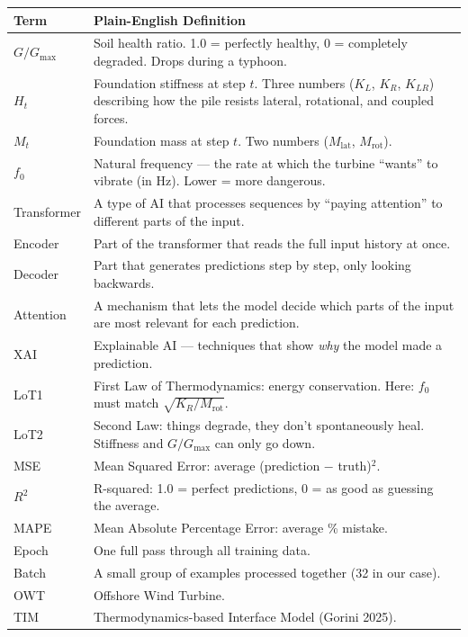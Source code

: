 \documentclass[11pt,a4paper]{article}
\begin{document}
\begin{center}
\begin{tabular}{lp{9.5cm}}
\toprule
\textbf{Term} & \textbf{Plain-English Definition} \\
\midrule
$G/G_{\max}$ & Soil health ratio.  1.0 = perfectly healthy,
  0 = completely degraded.  Drops during a typhoon. \\
$H_t$   & Foundation stiffness at step $t$.  Three numbers
  ($K_L$, $K_R$, $K_{LR}$) describing how the pile resists
  lateral, rotational, and coupled forces. \\
$M_t$   & Foundation mass at step $t$.  Two numbers
  ($M_{\text{lat}}$, $M_{\text{rot}}$). \\
$f_0$   & Natural frequency --- the rate at which the turbine
  ``wants'' to vibrate (in Hz).  Lower = more dangerous. \\
Transformer & A type of AI that processes sequences by
  ``paying attention'' to different parts of the input. \\
Encoder  & Part of the transformer that reads the full input
  history at once. \\
Decoder  & Part that generates predictions step by step,
  only looking backwards. \\
Attention & A mechanism that lets the model decide which parts
  of the input are most relevant for each prediction. \\
XAI      & Explainable AI --- techniques that show \emph{why}
  the model made a prediction. \\
LoT1     & First Law of Thermodynamics: energy conservation.
  Here: $f_0$ must match $\sqrt{K_R/M_{\text{rot}}}$. \\
LoT2     & Second Law: things degrade, they don't spontaneously
  heal.  Stiffness and $G/G_{\max}$ can only go down. \\
MSE      & Mean Squared Error: average (prediction $-$ truth)$^2$. \\
$R^2$    & R-squared: 1.0 = perfect predictions,
  0 = as good as guessing the average. \\
MAPE     & Mean Absolute Percentage Error: average \% mistake. \\
Epoch    & One full pass through all training data. \\
Batch    & A small group of examples processed together
  (32 in our case). \\
OWT      & Offshore Wind Turbine. \\
TIM      & Thermodynamics-based Interface Model (Gorini 2025). \\
\bottomrule
\end{tabular}
\end{center}
\end{document}
